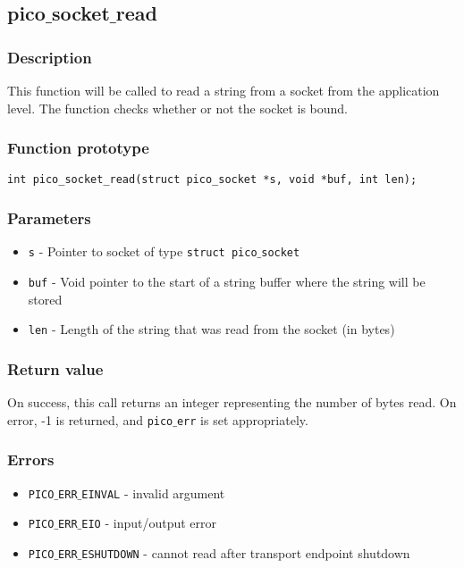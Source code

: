 \subsection{pico$\_$socket$\_$read}

\subsubsection*{Description}
This function will be called to read a string from a socket from the application level. The function checks whether or not the socket is bound.

\subsubsection*{Function prototype}
\begin{verbatim}
int pico_socket_read(struct pico_socket *s, void *buf, int len);
\end{verbatim}

\subsubsection*{Parameters}
\begin{itemize}[noitemsep]
\item \texttt{s} - Pointer to socket of type \texttt{struct pico$\_$socket}
\item \texttt{buf} - Void pointer to the start of a string buffer where the string will be stored
\item \texttt{len} - Length of the string that was read from the socket (in bytes)
\end{itemize}

\subsubsection*{Return value}
On success, this call returns an integer representing the number of bytes read.
On error, -1 is returned, and \texttt{pico$\_$err} is set appropriately.

\subsubsection*{Errors}
\begin{itemize}[noitemsep]
\item \texttt{PICO$\_$ERR$\_$EINVAL} - invalid argument
\item \texttt{PICO$\_$ERR$\_$EIO} - input/output error
\item \texttt{PICO$\_$ERR$\_$ESHUTDOWN} - cannot read after transport endpoint shutdown
\end{itemize}

